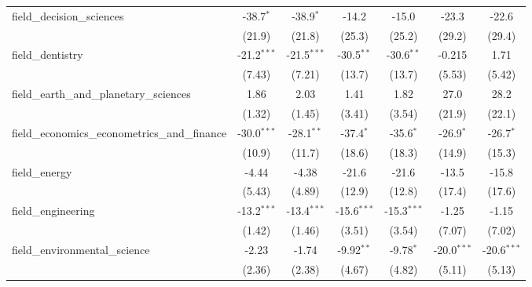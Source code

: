 \begin{tabular}{lcccccc}
   field\_decision\_sciences                                   & -38.7$^{*}$   & -38.9$^{*}$   & -14.2         & -15.0         & -23.3         & -22.6\\   
                                                               & (21.9)        & (21.8)        & (25.3)        & (25.2)        & (29.2)        & (29.4)\\   
   field\_dentistry                                            & -21.2$^{***}$ & -21.5$^{***}$ & -30.5$^{**}$  & -30.6$^{**}$  & -0.215        & 1.71\\   
                                                               & (7.43)        & (7.21)        & (13.7)        & (13.7)        & (5.53)        & (5.42)\\   
   field\_earth\_and\_planetary\_sciences                      & 1.86          & 2.03          & 1.41          & 1.82          & 27.0          & 28.2\\   
                                                               & (1.32)        & (1.45)        & (3.41)        & (3.54)        & (21.9)        & (22.1)\\   
   field\_economics\_econometrics\_and\_finance                & -30.0$^{***}$ & -28.1$^{**}$  & -37.4$^{*}$   & -35.6$^{*}$   & -26.9$^{*}$   & -26.7$^{*}$\\   
                                                               & (10.9)        & (11.7)        & (18.6)        & (18.3)        & (14.9)        & (15.3)\\   
   field\_energy                                               & -4.44         & -4.38         & -21.6         & -21.6         & -13.5         & -15.8\\   
                                                               & (5.43)        & (4.89)        & (12.9)        & (12.8)        & (17.4)        & (17.6)\\   
   field\_engineering                                          & -13.2$^{***}$ & -13.4$^{***}$ & -15.6$^{***}$ & -15.3$^{***}$ & -1.25         & -1.15\\   
                                                               & (1.42)        & (1.46)        & (3.51)        & (3.54)        & (7.07)        & (7.02)\\   
   field\_environmental\_science                               & -2.23         & -1.74         & -9.92$^{**}$  & -9.78$^{*}$   & -20.0$^{***}$ & -20.6$^{***}$\\   
                                                               & (2.36)        & (2.38)        & (4.67)        & (4.82)        & (5.11)        & (5.13)\\   

\end{tabular}
